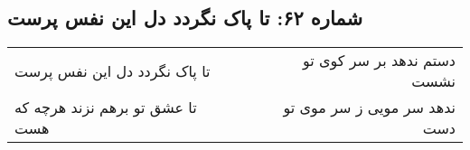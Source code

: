 \begin{center}
\section*{شماره ۶۲: تا پاک نگردد دل این نفس پرست}
\label{sec:062}
\begin{longtable}{l p{0.5cm} r}
تا پاک نگردد دل این نفس پرست
&&
دستم ندهد بر سر کوی تو نشست
\\
تا عشق تو برهم نزند هرچه که هست
&&
ندهد سر مویی ز سر موی تو دست
\\
\end{longtable}
\end{center}
